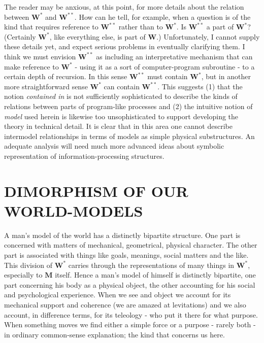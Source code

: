 \documentclass{article}
\begin{document}
The reader may be anxious, at this point, for more details about the relation between $\mathbf{W^\ast}$ and $\mathbf{W^{\ast\ast}}$. How can he tell, for example, when a question is of the kind that requires reference to $\mathbf{W^{\ast\ast}}$ rather than to $\mathbf{W^\ast}$. Is $\mathbf{W^{\ast\ast}}$ a part of $\mathbf{W^\ast}$? (Certainly $\mathbf{W^\ast}$, like everything else, is part of $\mathbf{W}$.) Unfortunately, I cannot supply these details yet, and expect serious problems in eventually clarifying them. I think we must envision $\mathbf{W^{\ast\ast}}$ as including an interpretative mechanism that can make reference to $\mathbf{W^\ast}$ - using it as a sort of computer-program subroutine - to a certain depth of recursion. In this sense $\mathbf{W^{\ast\ast}}$ must contain $\mathbf{W^\ast}$, but in another more straightforward sense $\mathbf{W^\ast}$ can contain $\mathbf{W^{\ast\ast}}$. This suggests (1) that the notion \textit{contained in} is not sufficiently sophisticated to describe the kinds of relations between parts of program-like processes and (2) the intuitive notion of \textit{model} used herein is likewise too unsophisticated to support developing the theory in technical detail. It is clear that in this area one cannot describe intermodel relationships in terms of models as simple physical substructures. An adequate analysis will need much more advanced ideas about symbolic representation of information-processing structures.

\section*{DIMORPHISM OF OUR WORLD-MODELS}

A man's model of the world has a distinctly bipartite structure. One part is concerned with matters of mechanical, geometrical, physical character. The other part is associated with things like goals, meanings, social matters and the like. This division of $\mathbf{W^\ast}$ carries through the representations of many things in $\mathbf{W^\ast}$, especially to $\mathbf{M}$ itself. Hence a man's model of himself is distinctly bipartite, one part concerning his body as a physical object, the other accounting for his social and psychological experience. When we see and object we account for its mechanical support and coherence (we are amazed at levitations) and we also account, in difference terms, for its teleology - who put it there for what purpose. When something moves we find either a simple force or a purpose - rarely both - in ordinary common-sense explanation; the kind that concerns us here.
\end{document}
